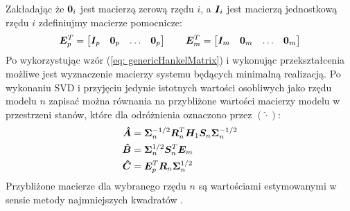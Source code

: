 Zakładając że $\bm{0}_i$ jest macierzą zerową rzędu $i$, a $\bm{I}_i$ jest macierzą jednostkową rzędu $i$ zdefiniujmy macierze pomocnicze:
\begin{equation} 
	\bm{E}^T_p =\begin{bmatrix}
		\bm{I}_p & \bm{0}_p & \dots & \bm{0}_p	
	\end{bmatrix} \qquad
	\bm{E}^T_m = \begin{bmatrix}
		\bm{I}_m & \bm{0}_m & \dots & \bm{0}_m	
	\end{bmatrix} 
\end{equation}
Po wykorzystując wzór (\ref{eq: genericHankelMatrix}) i wykonując przekształcenia możliwe jest wyznaczenie macierzy systemu będących minimalną realizacją. Po wykonaniu SVD i przyjęciu jedynie istotnych wartości osobliwych jako rzędu modelu $n$ zapisać można równania na przybliżone wartości macierzy modelu w przestrzeni stanów, które dla odróżnienia oznaczono przez $(\hat{\cdot})$:
\begin{equation}
	\begin{split}
		\bm{\hat{A}} &= \bm{\Sigma}_n^{-1/2}\bm{R}_n^T\bm{H}_1\bm{S}_n\bm{\Sigma}_n^{-1/2} \\
		\bm{\hat{B}} &= \bm{\Sigma}_n^{1/2}\bm{S}_n^T\bm{E}_m \\
		\bm{\hat{C}} &= \bm{E}_p^T\bm{R}_n\bm{\Sigma}_n^{1/2}
	\end{split}
\end{equation}
Przybliżone macierze dla wybranego rzędu $n$ są wartościami estymowanymi w sensie metody najmniejszych kwadratów \parencite{Juang1994, Rainieri2014}.
